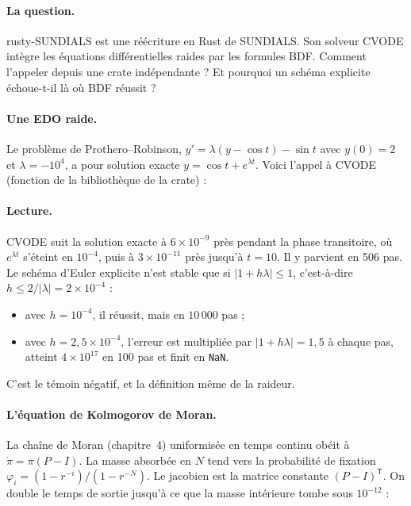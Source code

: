\paragraph{La question.} rusty-SUNDIALS est une réécriture en Rust de SUNDIALS. Son solveur CVODE intègre les équations
différentielles raides par les formules BDF. Comment l'appeler depuis une crate indépendante ? Et pourquoi un schéma
explicite échoue-t-il là où BDF réussit ?

\paragraph{Une EDO raide.} Le problème de Prothero--Robinson, $y'=\lambda(y-\cos t)-\sin t$ avec $y(0)=2$ et
$\lambda=-10^4$, a pour solution exacte $y=\cos t+e^{\lambda t}$. Voici l'appel à CVODE (fonction de la bibliothèque de
la crate) :


\paragraph{Lecture.} CVODE suit la solution exacte à $6\times10^{-9}$ près pendant la phase transitoire, où $e^{\lambda t}$
s'éteint en $10^{-4}$, puis à $3\times10^{-11}$ près jusqu'à $t=10$. Il y parvient en 506 pas. Le schéma d'Euler explicite
n'est stable que si $|1+h\lambda|\le1$, c'est-à-dire $h\le2/|\lambda|=2\times10^{-4}$ :
\begin{itemize}
\item avec $h=10^{-4}$, il réussit, mais en $10\,000$ pas ;
\item avec $h=2{,}5\times10^{-4}$, l'erreur est multipliée par $|1+h\lambda|=1{,}5$ à chaque pas, atteint $4\times10^{17}$
en 100 pas et finit en \texttt{NaN}.
\end{itemize}
C'est le témoin négatif, et la définition même de la raideur.

\paragraph{L'équation de Kolmogorov de Moran.} La chaîne de Moran (chapitre~4) uniformisée en temps continu obéit à
$\dot\pi=\pi(P-I)$. La masse absorbée en $N$ tend vers la probabilité de fixation
$\varphi_i=(1-r^{-i})/(1-r^{-N})$. Le jacobien est la matrice constante $(P-I)^{\mathsf T}$. On double le temps de
sortie jusqu'à ce que la masse intérieure tombe sous $10^{-12}$ :


